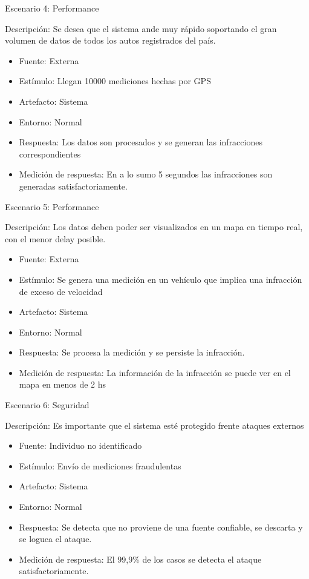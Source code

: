 Escenario 4: Performance


Descripción: Se desea que el sistema ande muy rápido soportando el gran volumen de datos de todos los autos registrados del país.
\begin{itemize}
\item Fuente: Externa
\item Estímulo: Llegan 10000 mediciones hechas por GPS
\item Artefacto: Sistema
\item Entorno: Normal
\item Respuesta: Los datos son procesados y se generan las infracciones correspondientes
\item Medición de respuesta: En a lo sumo 5 segundos las infracciones son generadas satisfactoriamente.
\end{itemize} 

Escenario 5: Performance


Descripción: Los datos deben poder ser visualizados en un mapa en tiempo real, con el menor delay posible.
\begin{itemize}
\item Fuente: Externa
\item Estímulo: Se genera una medición en un vehículo que implica una infracción de exceso de velocidad
\item Artefacto: Sistema
\item Entorno: Normal
\item Respuesta: Se procesa la medición y se persiste la infracción.
\item Medición de respuesta: La información de la infracción se puede ver en el mapa en menos de 2 hs
\end{itemize} 

Escenario 6: Seguridad


Descripción: Es importante que el sistema esté protegido frente ataques externos
\begin{itemize}
\item Fuente: Individuo no identificado
\item Estímulo: Envío de mediciones fraudulentas
\item Artefacto: Sistema
\item Entorno: Normal
\item Respuesta: Se detecta que no proviene de una fuente confiable, se descarta y se loguea el ataque. 
\item Medición de respuesta: El 99,9\% de los casos se detecta el ataque satisfactoriamente.
\end{itemize} 

